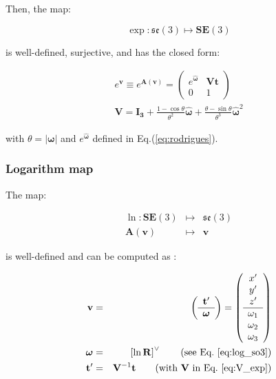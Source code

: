 \documentclass[a4paper,11pt]{report}
\newcommand{\W}{{\bm{\omega}}}
\begin{document}
Then, the map:

\begin{equation}
  \exp: \mathfrak{se}(3) \mapsto \mathbf{SE}(3)
\end{equation}

\noindent is well-defined, surjective, and has the closed form:

\begin{eqnarray}
  e^ { \mathbf{v} } \equiv  e^ { \mathbf{A}(\mathbf{v}) } =
\left(
\begin{array}{cc}
  e^{\hat{\W}} & \mathbf{V} \mathbf{t} \\
   0 & 1
\end{array}
\right)
\\
\label{eq:V_exp}
\mathbf{V} = \mathbf{I_3}
+ \frac{1-\cos \theta}{\theta^2} \hat{\W}
+ \frac{\theta- \sin \theta}{\theta^3} \hat{\W}^2
\end{eqnarray}

\noindent with $\theta = |\W|$ and $e^{\hat{\W}}$
defined in Eq.(\ref{eq:rodrigues}).



\subsubsection{Logarithm map}

The map:

\begin{eqnarray}
  \ln: \mathbf{SE}(3) &\mapsto& \mathfrak{se}(3) \\
  \mathbf{A}(\mathbf{v})  & \mapsto & \mathbf{v}
\nonumber
\end{eqnarray}

\noindent is well-defined and can be computed as \cite{wang2008nps}:

\begin{eqnarray}
\label{eq:rodrigues_ln_se3}
\mathbf{v} &=&
\left(
\begin{array}{c}
 \mathbf{t}' \\ \hline \W
\end{array}
\right)
=
\left(
\begin{array}{c}
 x'\\y'\\z' \\ \hline \omega_1 \\ \omega_2 \\ \omega_3
\end{array}
\right)
\nonumber \\
\W &=& \left[ \ln \mathbf{R} \right]^\vee  \quad \quad \text{(see Eq.~\ref{eq:log_so3})}
\\
\mathbf{t}' &=& \mathbf{V}^{-1} \mathbf{t} \quad \quad \text{(with $\mathbf{V}$ in Eq.~\ref{eq:V_exp})}
\end{eqnarray}
\end{document}
